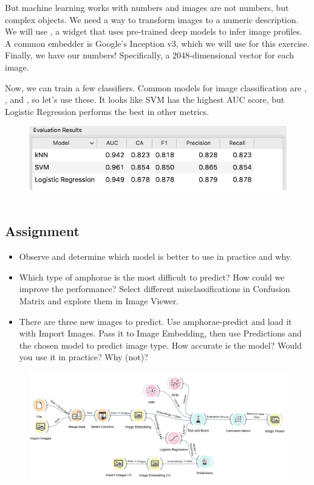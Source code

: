 But machine learning works with numbers and images are not numbers, but complex objects. We need a way to transform images to a numeric description. We will use , a widget that uses pre-trained deep models to infer image profiles. A common embedder is Google's Inception v3, which we will use for this exercise. Finally, we have our numbers! Specifically, a 2048-dimensional vector for each image.

Now, we can train a few classifiers. Common models for image classification are , , and , so let's use these. It looks like SVM has the highest AUC score, but Logistic Regression performs the best in other metrics.

\begin{figure}[h]
    \centering
    \includegraphics[scale=0.5]{test-and-score.png}
    \caption{$\;$} %
\end{figure}

\subsection{Assignment}

\begin{itemize}
    \item Observe  and determine which model is better to use in practice and why.
    \item Which type of amphorae is the most difficult to predict? How could we improve the performance? Select different misclassifications in Confusion Matrix and explore them in Image Viewer.
    \item There are three new images to predict. Use amphorae-predict and load it with Import Images. Pass it to Image Embedding, then use Predictions and the chosen model to predict image type. How accurate is the model? Would you use it in practice? Why (not)?
\end{itemize}

\begin{figure}[h]
    \centering
    \includegraphics[width=\textwidth]{final-workflow.png}
    \caption{$\;$} %
\end{figure}
